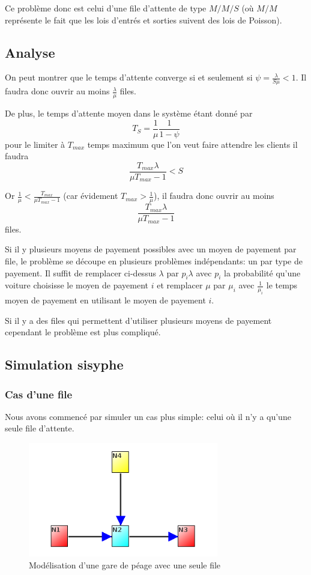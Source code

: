 \documentclass{scrartcl}
\begin{document}
  Ce problème donc est celui d'une file d'attente de type $M/M/S$ (où $M/M$
  représente le fait que les lois d'entrés et sorties suivent des lois de
  Poisson).

  \subsection{Analyse}
    On peut montrer que le temps d'attente converge si et seulement si $\psi =
    \frac \lambda {S\mu} < 1$. Il faudra donc ouvrir au moins $\frac \lambda
    \mu$ files.

    De plus, le temps d'attente moyen dans le système étant donné par
      \[T_S = \frac 1 \mu \frac 1 {1-\psi}\]
    pour le limiter à $T_{max}$ temps maximum que l'on veut faire attendre les
    clients il faudra \[\frac {T_{max}\lambda}{\mu T_{max}-1} < S\]

    Or $\frac 1 \mu < \frac{T_{max}}{\mu T_{max}-1}$ (car évidement $T_{max} >
    \frac 1 \mu$), il faudra donc ouvrir au moins
      \[\frac{T_{max}\lambda}{\mu T_{max}-1}\]
    files.

    Si il y plusieurs moyens de payement possibles avec un moyen de payement
    par file, le problème se découpe en plusieurs problèmes indépendants: un
    par type de payement. Il suffit de remplacer ci-dessus $\lambda$ par
    $p_i\lambda$ avec $p_i$ la probabilité qu'une voiture choisisse le moyen de
    payement $i$ et remplacer $\mu$ par $\mu_i$ avec $\frac 1 {\mu_i}$ le temps
    moyen de payement en utilisant le moyen de payement $i$.

    Si il y a des files qui permettent d'utiliser plusieurs moyens de payement
    cependant le problème est plus compliqué.

  \subsection{Simulation sisyphe}
    \subsubsection{Cas d'une file}
      Nous avons commencé par simuler un cas plus simple: celui où il n'y a
      qu'une seule file d'attente.

      \begin{figure}[htbp]
        \centering
        \includegraphics[height=5cm]{img/poisson_simple.png}
        \caption{Modélisation d'une gare de péage avec une seule file}
        \label{figure:syphilis_simple}
      \end{figure}
\end{document}
